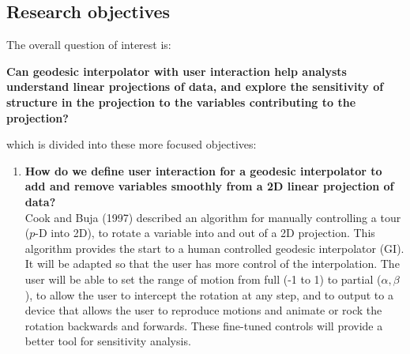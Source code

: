 \documentclass[11,]{article}
\providecommand{\tightlist}{%
  \setlength{\itemsep}{0pt}\setlength{\parskip}{0pt}}
\begin{document}
\hypertarget{research-objectives}{%
\subsection{Research objectives}\label{research-objectives}}

The overall question of interest is:

\textbf{Can geodesic interpolator with user interaction help analysts understand linear projections of data, and explore the sensitivity of structure in the projection to the variables contributing to the projection?}

which is divided into these more focused objectives:

\begin{enumerate}
\def\labelenumi{\arabic{enumi}.}
\tightlist
\item
  \textbf{How do we define user interaction for a geodesic interpolator to add and remove variables smoothly from a 2D linear projection of data?}\\
  Cook and Buja (1997) described an algorithm for manually controlling a tour (\(p\)-D into 2D), to rotate a variable into and out of a 2D projection. This algorithm provides the start to a human controlled geodesic interpolator (GI). It will be adapted so that the user has more control of the interpolation. The user will be able to set the range of motion from full (-1 to 1) to partial (\(\alpha, \beta\)), to allow the user to intercept the rotation at any step, and to output to a device that allows the user to reproduce motions and animate or rock the rotation backwards and forwards. These fine-tuned controls will provide a better tool for sensitivity analysis.
\end{enumerate}
\end{document}
